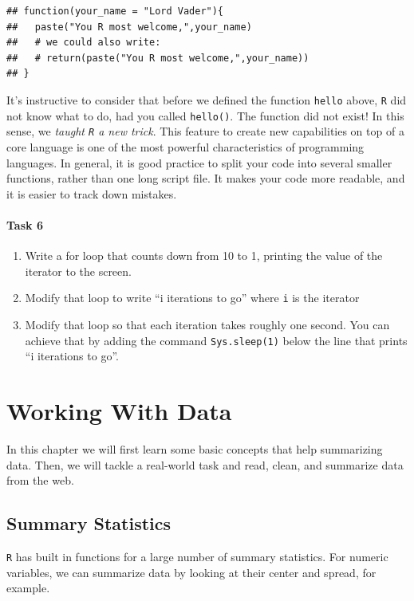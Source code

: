 \documentclass[]{book}
\providecommand{\tightlist}{%
  \setlength{\itemsep}{0pt}\setlength{\parskip}{0pt}}
\begin{document}
\begin{verbatim}
## function(your_name = "Lord Vader"){
##   paste("You R most welcome,",your_name)
##   # we could also write:
##   # return(paste("You R most welcome,",your_name))
## }
\end{verbatim}

It's instructive to consider that before we defined the function
\texttt{hello} above, \texttt{R} did not know what to do, had you called
\texttt{hello()}. The function did not exist! In this sense, we
\emph{taught \texttt{R} a new trick}. This feature to create new
capabilities on top of a core language is one of the most powerful
characteristics of programming languages. In general, it is good
practice to split your code into several smaller functions, rather than
one long script file. It makes your code more readable, and it is easier
to track down mistakes.

\subsubsection{Task 6}\label{task-6}

\begin{enumerate}
\def\labelenumi{\arabic{enumi}.}
\tightlist
\item
  Write a for loop that counts down from 10 to 1, printing the value of
  the iterator to the screen.
\item
  Modify that loop to write ``i iterations to go'' where \texttt{i} is
  the iterator
\item
  Modify that loop so that each iteration takes roughly one second. You
  can achieve that by adding the command \texttt{Sys.sleep(1)} below the
  line that prints ``i iterations to go''.
\end{enumerate}

\chapter{Working With Data}\label{sum}

In this chapter we will first learn some basic concepts that help
summarizing data. Then, we will tackle a real-world task and read,
clean, and summarize data from the web.

\section{Summary Statistics}\label{summary-statistics}

\texttt{R} has built in functions for a large number of summary
statistics. For numeric variables, we can summarize data by looking at
their center and spread, for example.
\end{document}
